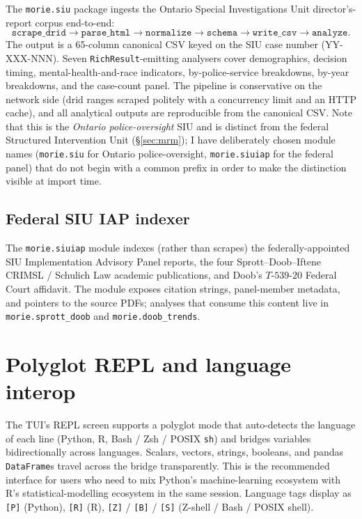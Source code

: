 \documentclass[11pt,a4paper]{article}
\theoremstyle{plain}
\theoremstyle{definition}
\theoremstyle{remark}
\begin{document}
The \texttt{morie.siu} package ingests the Ontario Special
Investigations Unit director's-report corpus end-to-end:
\begin{equation}
  \texttt{scrape\_drid} \to \texttt{parse\_html}
   \to \texttt{normalize} \to \texttt{schema}
   \to \texttt{write\_csv} \to \texttt{analyze}.
\end{equation}
The output is a 65-column canonical CSV keyed on the SIU case
number ($\mathrm{YY}$-$\mathrm{XXX}$-$\mathrm{NNN}$). Seven
\texttt{RichResult}-emitting analysers cover demographics, decision
timing, mental-health-and-race indicators, by-police-service
breakdowns, by-year breakdowns, and the case-count panel.
The pipeline is conservative on the network side ($\mathrm{drid}$
ranges scraped politely with a concurrency limit and an HTTP cache),
and all analytical outputs are reproducible from the canonical CSV.
Note that this is the \emph{Ontario police-oversight} SIU and is
distinct from the federal Structured Intervention Unit
(\S\ref{sec:mrm}); I have deliberately chosen module names
(\texttt{morie.siu} for Ontario police-oversight,
\texttt{morie.siuiap} for the federal panel) that do not begin
with a common prefix in order to make the distinction visible at
import time.

\subsection{Federal SIU IAP indexer}

The \texttt{morie.siuiap} module indexes (rather than scrapes)
the federally-appointed SIU Implementation Advisory Panel
reports, the four Sprott--Doob--Iftene CRIMSL / Schulich Law
academic publications, and Doob's $T$-$539$-$20$ Federal Court
affidavit. The module exposes citation strings, panel-member
metadata, and pointers to the source PDFs; analyses that consume
this content live in \texttt{morie.sprott\_doob} and
\texttt{morie.doob\_trends}.

\section{Polyglot REPL and language interop}
\label{sec:polyglot}

The TUI's REPL screen supports a polyglot mode that auto-detects
the language of each line (Python, R, Bash / Zsh / POSIX
\texttt{sh}) and bridges variables bidirectionally across
languages. Scalars, vectors, strings, booleans, and pandas
\texttt{DataFrame}s travel across the bridge transparently.
This is the recommended interface for users who need to mix
Python's machine-learning ecosystem with R's statistical-modelling
ecosystem in the same session. Language tags display as
\texttt{[P]} (Python), \texttt{[R]} (R), \texttt{[Z]} / \texttt{[B]}
/ \texttt{[S]} (Z-shell / Bash / POSIX shell).
\end{document}
